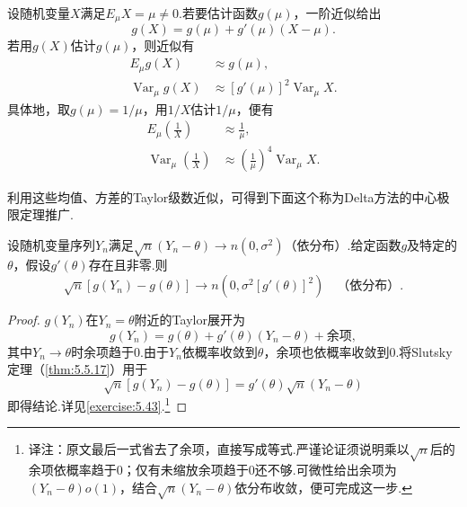 \begin{example}[近似均值与方差]\label{ex:5.5.23}
设随机变量$X$满足$E_\mu X=\mu\ne0$.若要估计函数$g(\mu)$，一阶近似给出
$$g(X)=g(\mu)+g'(\mu)(X-\mu).$$
若用$g(X)$估计$g(\mu)$，则近似有
$$\begin{aligned}E_\mu g(X)&\approx g(\mu),\\\operatorname{Var}_\mu g(X)&\approx[g'(\mu)]^2\operatorname{Var}_\mu X.\end{aligned}$$
具体地，取$g(\mu)=1/\mu$，用$1/X$估计$1/\mu$，便有
$$\begin{aligned}E_\mu\left(\frac1X\right)&\approx\frac1\mu,\\
\operatorname{Var}_\mu\left(\frac1X\right)&\approx\left(\frac1\mu\right)^4\operatorname{Var}_\mu X.\end{aligned}$$
\end{example}
利用这些均值、方差的Taylor级数近似，可得到下面这个称为Delta方法的中心极限定理推广.
\begin{theorem}[Delta方法]\label{thm:5.5.24}
设随机变量序列$Y_n$满足$\sqrt n(Y_n-\theta)\to n(0,\sigma^2)$（依分布）.给定函数$g$及特定的$\theta$，假设$g'(\theta)$存在且非零.则
\begin{equation}\label{eq:5.5.10}
\sqrt n[g(Y_n)-g(\theta)]\to n(0,\sigma^2[g'(\theta)]^2)\quad\text{（依分布）}.
\end{equation}
\end{theorem}
\begin{proof}
$g(Y_n)$在$Y_n=\theta$附近的Taylor展开为
\begin{equation}\label{eq:5.5.11}
g(Y_n)=g(\theta)+g'(\theta)(Y_n-\theta)+\text{余项},
\end{equation}
其中$Y_n\to\theta$时余项趋于0.由于$Y_n$依概率收敛到$\theta$，余项也依概率收敛到0.将Slutsky定理（\autoref{thm:5.5.17}）用于
$$\sqrt n[g(Y_n)-g(\theta)]=g'(\theta)\sqrt n(Y_n-\theta)$$
即得结论.详见\autoref{exercise:5.43}.\footnote{译注：原文最后一式省去了余项，直接写成等式.严谨论证须说明乘以$\sqrt n$后的余项依概率趋于0；仅有未缩放余项趋于0还不够.可微性给出余项为$(Y_n-\theta)o(1)$，结合$\sqrt n(Y_n-\theta)$依分布收敛，便可完成这一步.}
\end{proof}
